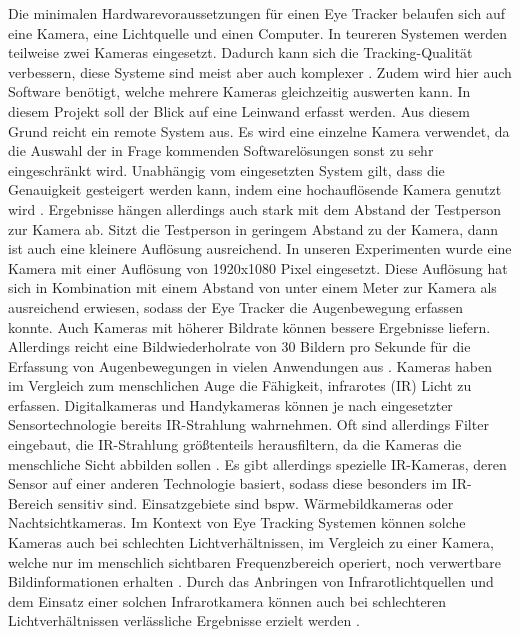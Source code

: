 Die minimalen Hardwarevoraussetzungen für einen Eye Tracker belaufen sich auf eine Kamera, eine Lichtquelle und einen Computer. In teureren Systemen werden teilweise zwei Kameras eingesetzt. Dadurch kann sich die Tracking-Qualität verbessern, diese Systeme sind meist aber auch komplexer \cite{lit_website_eyeware_eyetracker_blog}. Zudem wird hier auch Software benötigt, welche mehrere Kameras gleichzeitig auswerten kann.
In diesem Projekt soll der Blick auf eine Leinwand erfasst werden. Aus diesem Grund reicht ein remote System aus. Es wird eine einzelne Kamera verwendet, da die Auswahl der in Frage kommenden Softwarelösungen sonst zu sehr eingeschränkt wird. 
Unabhängig vom eingesetzten System gilt, dass die Genauigkeit gesteigert werden kann, indem eine hochauflösende Kamera genutzt wird \cite{lit_website_bitbrain}. Ergebnisse hängen allerdings auch stark mit dem Abstand der Testperson zur Kamera ab. Sitzt die Testperson in geringem Abstand zu der Kamera, dann ist auch eine kleinere Auflösung ausreichend. In unseren Experimenten wurde eine Kamera mit einer Auflösung von 1920x1080 Pixel eingesetzt. Diese Auflösung hat sich in Kombination mit einem Abstand von unter einem Meter zur Kamera als ausreichend erwiesen, sodass der Eye Tracker die Augenbewegung erfassen konnte. Auch Kameras mit höherer Bildrate können bessere Ergebnisse liefern. Allerdings reicht eine \Gls{Bildwiederholrate} von 30 Bildern pro Sekunde für die Erfassung von Augenbewegungen in vielen Anwendungen aus \cite{lit_tracking_framerate}. Kameras haben im Vergleich zum menschlichen Auge die Fähigkeit, infrarotes ({\acs{IR}}) Licht zu erfassen. Digitalkameras und Handykameras können je nach eingesetzter Sensortechnologie bereits {\acs{IR}}-Strahlung wahrnehmen. Oft sind allerdings Filter eingebaut, die {\acs{IR}}-Strahlung größtenteils herausfiltern, da die Kameras die menschliche Sicht abbilden sollen \cite{lit_website_eyeware_eyetracker_blog}. Es gibt allerdings spezielle {\acs{IR}}-Kameras, deren Sensor auf einer anderen Technologie basiert, sodass diese besonders im {\acs{IR}}-Bereich sensitiv sind. Einsatzgebiete sind bspw. Wärmebildkameras oder Nachtsichtkameras. Im Kontext von Eye Tracking Systemen können solche Kameras auch bei schlechten Lichtverhältnissen, im Vergleich zu einer Kamera, welche nur im menschlich sichtbaren Frequenzbereich operiert, noch verwertbare Bildinformationen erhalten \cite{lit_article_infrared}.
Durch das Anbringen von Infrarotlichtquellen und dem Einsatz einer solchen Infrarotkamera können auch bei schlechteren Lichtverhältnissen verlässliche Ergebnisse erzielt werden \cite{lit_article_stateoftheart_eyetracker}.

